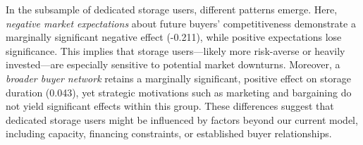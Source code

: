 \documentclass[12pt]{article}
\begin{document}
In the subsample of dedicated storage users, different patterns emerge. Here, \textit{negative market expectations} about future buyers' competitiveness demonstrate a marginally significant negative effect (-0.211), while positive expectations lose significance. This implies that storage users—likely more risk-averse or heavily invested—are especially sensitive to potential market downturns. Moreover, a \textit{broader buyer network} retains a marginally significant, positive effect on storage duration (0.043), yet strategic motivations such as marketing and bargaining do not yield significant effects within this group. These differences suggest that dedicated storage users might be influenced by factors beyond our current model, including capacity, financing constraints, or established buyer relationships.



\newpage

\end{document}
